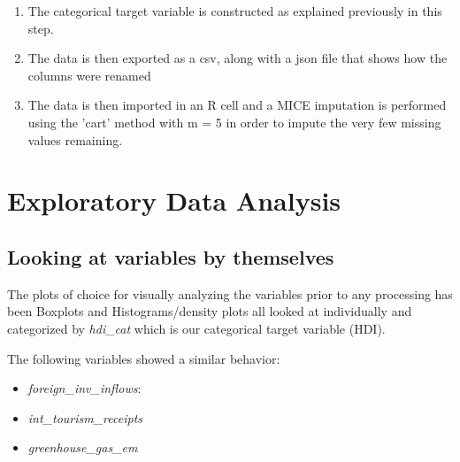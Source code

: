 \documentclass[]{article}
\providecommand{\tightlist}{%
  \setlength{\itemsep}{0pt}\setlength{\parskip}{0pt}}
\begin{document}
\begin{enumerate}
  \item The categorical target variable is constructed as explained previously in this step.

  \item The data is then exported as a csv, along with a json file that shows how the columns were renamed

  \item The data is then imported in an R cell and a MICE imputation is performed using the 'cart' method with m = 5 in order to impute the very few missing values remaining.
\end{enumerate}

\newpage

\hypertarget{exploratory-data-analysis}{%
\section{Exploratory Data Analysis}\label{exploratory-data-analysis}}

\hypertarget{looking-at-variables-by-themselves}{%
\subsection{Looking at variables by
themselves}\label{looking-at-variables-by-themselves}}

The plots of choice for visually analyzing the variables prior to any
processing has been Boxplots and Histograms/density plots all looked at
individually and categorized by \emph{hdi\_cat} which is our categorical
target variable (HDI).

The following variables showed a similar behavior:

\begin{itemize}
\tightlist
\item
  \emph{foreign\_inv\_inflows}:
\item
  \emph{int\_tourism\_receipts}
\item
  \emph{greenhouse\_gas\_em}
\end{itemize}
\end{document}
